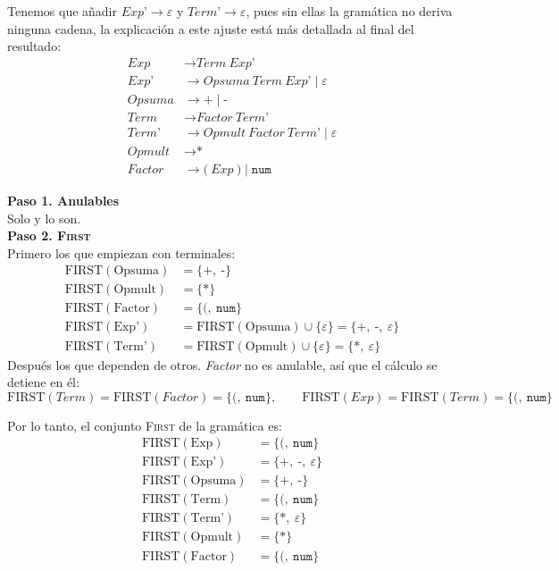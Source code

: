 \documentclass[12pt,letterpaper]{article}
\newcommand{\nt}[1]{\textit{#1}}
\newcommand{\tk}[1]{\texttt{#1}}
\newcommand{\tx}[1]{\text{#1}}
\newcommand{\First}[1]{\mathrm{FIRST}(#1)}
\newcommand{\eps}{\varepsilon}
\begin{document}
\begin{enumerate}[label=\arabic*.]
\begin{itemize}
    Tenemos que añadir $\nt{Exp'}\to\eps$ y $\nt{Term'}\to\eps$, pues sin ellas la gramática no deriva ninguna
    cadena, la explicación a este ajuste está más detallada al final del resultado:
    \[
    \begin{aligned}
      \nt{Exp}    &\to \nt{Term}\ \nt{Exp'} \\
      \nt{Exp'}   &\to \nt{Opsuma}\ \nt{Term}\ \nt{Exp'} \mid \eps \\
      \nt{Opsuma} &\to \tk{+} \mid \tk{-} \\
      \nt{Term}   &\to \nt{Factor}\ \nt{Term'} \\
      \nt{Term'}  &\to \nt{Opmult}\ \nt{Factor}\ \nt{Term'} \mid \eps \\
      \nt{Opmult} &\to \tk{*} \\
      \nt{Factor} &\to \tk{(}\ \nt{Exp}\ \tk{)} \mid \tk{num}
    \end{aligned}
    \]

    \bigskip
    
    \textbf{Paso 1. Anulables}\\
    Solo \tx{Exp'} y \tx{Term'} lo son.\\

    \textbf{Paso 2. \textsc{First}}\\
    Primero los que empiezan con terminales:
    \[
    \begin{aligned}
      \First{\tx{Opsuma}} &= \{\tk{+},\ \tk{-}\} \\
      \First{\tx{Opmult}} &= \{\tk{*}\} \\
      \First{\tx{Factor}} &= \{\tk{(},\ \tk{num}\} \\
      \First{\tx{Exp'}}   &= \First{\tx{Opsuma}} \cup \{\eps\} = \{\tk{+},\ \tk{-},\ \eps\} \\
      \First{\tx{Term'}}  &= \First{\tx{Opmult}} \cup \{\eps\} = \{\tk{*},\ \eps\}
    \end{aligned}
    \]
    Después los que dependen de otros. \nt{Factor} no es anulable, así que el cálculo se detiene en él:
    \[
    \First{\nt{Term}} = \First{\nt{Factor}} = \{\tk{(},\ \tk{num}\}, \qquad
    \First{\nt{Exp}} = \First{\nt{Term}} = \{\tk{(},\ \tk{num}\}
    \]

    Por lo tanto, el conjunto \textsc{First} de la gramática es:
    \[
    \begin{aligned}
      \First{\tx{Exp}}    &= \{\tk{(},\ \tk{num}\} \\
      \First{\tx{Exp'}}   &= \{\tk{+},\ \tk{-},\ \eps\} \\
      \First{\tx{Opsuma}} &= \{\tk{+},\ \tk{-}\} \\
      \First{\tx{Term}}   &= \{\tk{(},\ \tk{num}\} \\
      \First{\tx{Term'}}  &= \{\tk{*},\ \eps\} \\
      \First{\tx{Opmult}} &= \{\tk{*}\} \\
      \First{\tx{Factor}} &= \{\tk{(},\ \tk{num}\}
    \end{aligned}
    \]
    

\end{itemize}
\end{enumerate}
\end{document}
